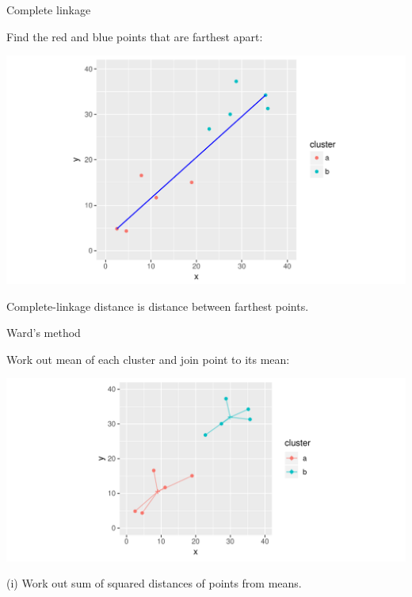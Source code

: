 \begin{frame}[fragile]{Complete linkage}
  
  Find the red and blue points that are farthest apart:
  
\begin{knitrout}
\color{fgcolor}
\includegraphics[width=\maxwidth]{figure/unnamed-chunk-4-1} 

\end{knitrout}

Complete-linkage distance is distance between farthest points. 
  
\end{frame}

\begin{frame}[fragile]{Ward's method}
  
  Work out mean of each cluster and join point to its mean:
  
\begin{knitrout}
\color{fgcolor}
\includegraphics[width=\maxwidth]{figure/unnamed-chunk-5-1} 

\end{knitrout}

(i) Work out sum of squared distances of points from means.
\end{frame}

